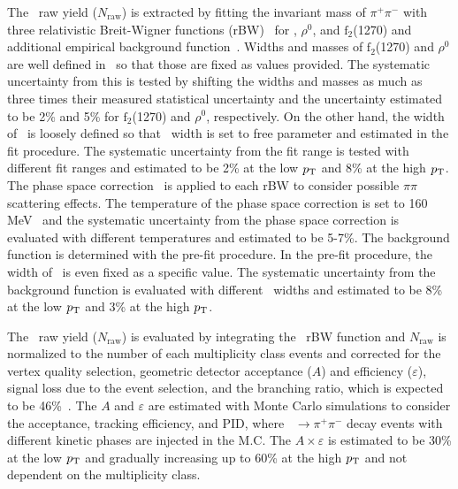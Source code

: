 \documentclass[ALICE,manyauthors]{cernphprep}
\begin{document}
The \fzero~raw yield ($N_{\mathrm{raw}}$) is extracted by fitting the invariant mass of $\pi^{+}\pi^{-}$ with three relativistic Breit-Wigner functions (rBW)~\cite{ALICE:2015nbw} for \fzero, $\rho^{0}$, and $\mathrm{f}_{2}$(1270) and additional empirical background function~\cite{OPAL:1998enc}. Widths and masses of $\mathrm{f}_{2}$(1270) and $\rho^{0}$ are well defined in~\cite{ParticleDataGroup:2020ssz} so that those are fixed as values provided. The systematic uncertainty from this is tested by shifting the widths and masses as much as three times their measured statistical uncertainty and the uncertainty estimated to be 2\% and 5\% for $\mathrm{f}_{2}$(1270) and $\rho^{0}$, respectively. On the other hand, the width of \fzero~is loosely defined so that \fzero~width is set to free parameter and estimated in the fit procedure. The systematic uncertainty from the fit range is tested with different fit ranges and estimated to be 2\% at the low $p_{\rm{T}}$ and 8\% at the high $p_{\rm{T}}$. The phase space correction~\cite{Rapp:2003ar} is applied to each rBW to consider possible $\pi\pi$ scattering effects. The temperature of the phase space correction is set to 160 MeV~\cite{ALICE:2013wgn} and the systematic uncertainty from the phase space correction is evaluated with different temperatures and estimated to be 5-7\%. The background function is determined with the pre-fit procedure. In the pre-fit procedure, the width of \fzero~is even fixed as a specific value. The systematic uncertainty from the background function is evaluated with different \fzero~widths and estimated to be 8\% at the low $p_{\rm{T}}$ and 3\% at the high $p_{\rm{T}}$.

The \fzero~raw yield ($N_{\mathrm{raw}}$) is evaluated by integrating the \fzero~rBW function and $N_{\mathrm{raw}}$ is normalized to the number of each multiplicity class events and corrected for the vertex quality selection, geometric detector acceptance ($A$) and efficiency ($\varepsilon$), signal loss due to the event selection, and the branching ratio, which is expected to be 46\%~\cite{Stone:2013eaa}.
The $A$ and $\varepsilon$ are estimated with Monte Carlo simulations to consider the acceptance, tracking efficiency, and PID, where \fzero~$\rightarrow \pi^{+}\pi^{-}$ decay events with different kinetic phases are injected in the M.C. The $A \times \varepsilon$ is estimated to be 30\% at the low $p_{\rm{T}}$ and gradually increasing up to 60\% at the high $p_{\rm{T}}$ and not dependent on the multiplicity class.
\end{document}
